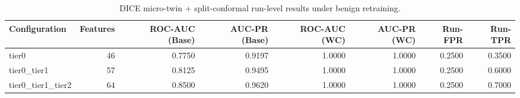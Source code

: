 \begin{table}[t]
\centering
\caption{DICE micro-twin + split-conformal run-level results under benign retraining.}
\label{tab:dice_full_overall}
\footnotesize
\begin{tabular}{lrrrrrrr}
\toprule
Configuration & Features & ROC-AUC (Base) & AUC-PR (Base) & ROC-AUC (WC) & AUC-PR (WC) & Run-FPR & Run-TPR \\
\midrule
tier0 & 46 & 0.7750 & 0.9197 & 1.0000 & 1.0000 & 0.2500 & 0.3500 \\
tier0_tier1 & 57 & 0.8125 & 0.9495 & 1.0000 & 1.0000 & 0.2500 & 0.6000 \\
tier0_tier1_tier2 & 64 & 0.8500 & 0.9620 & 1.0000 & 1.0000 & 0.2500 & 0.7000 \\
\bottomrule
\end{tabular}

\end{table}
